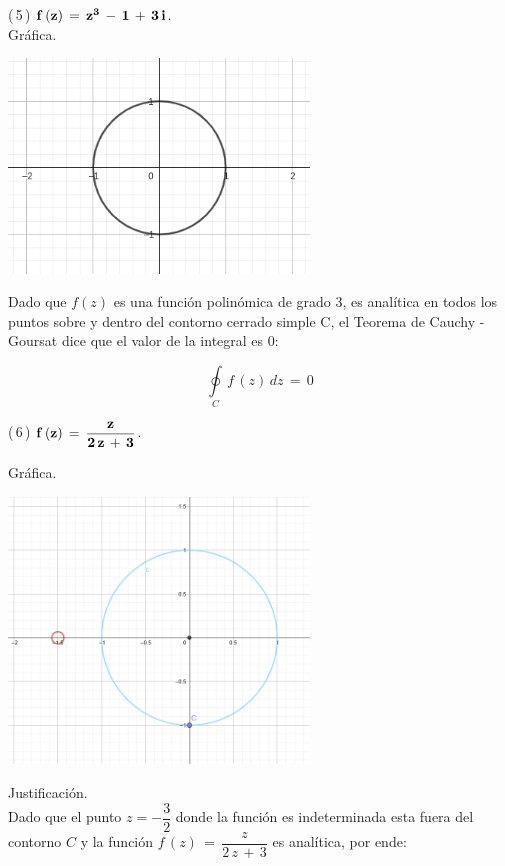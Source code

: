 \documentclass[a4paper,11pt,openany]{book}
\begin{document}
\textcolor{ao(english)}{(\,5\,)} $\bf{f\,(z)\,=\,z^{3}\,-\,1\,+\,3\,i}$.\\

\textcolor{ao(english)}{} Gráfica.

\begin{center}
     \includegraphics[width=8cm]{figura-5.png}
\end{center}

Dado que $f(z)$ es una función polinómica de grado 3, es analítica en todos los puntos sobre y dentro del contorno cerrado simple C, el Teorema de Cauchy - Goursat dice que el valor de la integral es 0:

$$\oint\limits_{C}\,f\,(z)\,dz\,=\,0$$

\textcolor{ao(english)}{(\,6\,)} $\bf{f\,(z)\,=\,\dfrac{z}{2\,z\,+\,3}}$.

\textcolor{ao(english)}{} Gráfica.

\begin{center}
     \includegraphics[width=8cm]{Gra-Ej-6.png}
\end{center}

\textcolor{ao(english)}{} Justificación.\\

Dado que el punto $z=-\dfrac{3}{2}$ donde la función es indeterminada esta fuera del contorno $C$
y la función  $f\,(z)\,=\,\dfrac{z}{2\,z\,+\,3}$ es analítica, por ende:
\end{document}
